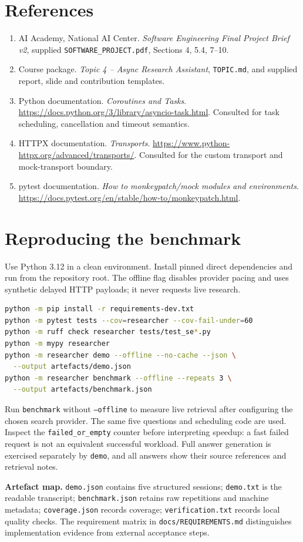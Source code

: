 \documentclass[11pt,a4paper]{article}
\begin{document}
\clearpage
\section*{References}
\begin{enumerate}[leftmargin=*]
\item AI Academy, National AI Center. \emph{Software Engineering Final Project Brief v2}, supplied \texttt{SOFTWARE\_PROJECT.pdf}, Sections 4, 5.4, 7--10.
\item Course package. \emph{Topic 4 -- Async Research Assistant}, \texttt{TOPIC.md}, and supplied report, slide and contribution templates.
\item Python documentation. \emph{Coroutines and Tasks}. \url{https://docs.python.org/3/library/asyncio-task.html}. Consulted for task scheduling, cancellation and timeout semantics.
\item HTTPX documentation. \emph{Transports}. \url{https://www.python-httpx.org/advanced/transports/}. Consulted for the custom transport and mock-transport boundary.
\item pytest documentation. \emph{How to monkeypatch/mock modules and environments}. \url{https://docs.pytest.org/en/stable/how-to/monkeypatch.html}.
\end{enumerate}

\appendix
\section{Reproducing the benchmark}
Use Python 3.12 in a clean environment. Install pinned direct dependencies and run from the repository root. The offline flag disables provider pacing and uses synthetic delayed HTTP payloads; it never requests live research.
\begin{lstlisting}[style=python,language=bash,numbers=none]
python -m pip install -r requirements-dev.txt
python -m pytest tests --cov=researcher --cov-fail-under=60
python -m ruff check researcher tests/test_se*.py
python -m mypy researcher
python -m researcher demo --offline --no-cache --json \
  --output artefacts/demo.json
python -m researcher benchmark --offline --repeats 3 \
  --output artefacts/benchmark.json
\end{lstlisting}
Run \texttt{benchmark} without \texttt{--offline} to measure live retrieval after configuring the chosen search provider. The same five questions and scheduling code are used. Inspect the \texttt{failed\_or\_empty} counter before interpreting speedup: a fast failed request is not an equivalent successful workload. Full answer generation is exercised separately by \texttt{demo}, and all answers show their source references and retrieval notes.

\textbf{Artefact map.} \texttt{demo.json} contains five structured sessions; \texttt{demo.txt} is the readable transcript; \texttt{benchmark.json} retains raw repetitions and machine metadata; \texttt{coverage.json} records coverage; \texttt{verification.txt} records local quality checks. The requirement matrix in \texttt{docs/REQUIREMENTS.md} distinguishes implementation evidence from external acceptance steps.
\end{document}
